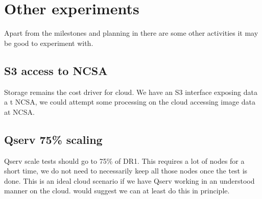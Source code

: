 \section{Other experiments}
Apart from the milestones and planning in  there are some other activities it may be good to experiment with.

\subsection{S3 access to NCSA}
Storage remains the cost driver for cloud. We have an S3 interface exposing data a t NCSA,
we could attempt some processing on the cloud accessing image data at NCSA.

\subsection{Qserv 75\% scaling}
Qserv scale tests should go to 75\% of DR1.  This requires a lot of nodes for a short time,
we do not need to necessarily keep all those nodes once the test is done. This is an
ideal cloud scenario if we have Qserv working in an understood manner on the cloud.  would suggest we can at least do this in principle.
